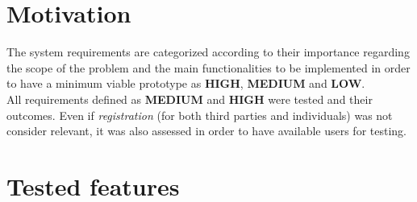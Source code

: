 \documentclass[a4paper, hidelinks, 12pt]{report}
\begin{document}
	\section{Motivation}
	The system requirements are categorized according to their importance regarding the scope of the problem and the main functionalities to be implemented in order to have a minimum viable prototype as \textbf{HIGH}, \textbf{MEDIUM} and \textbf{LOW}. \\

	All requirements defined as \textbf{MEDIUM} and \textbf{HIGH} were tested and their outcomes. Even if \textit{registration} (for both third parties and individuals) was not consider relevant, it was also assessed in order to have available users for testing.

	\section{Tested features}
\end{document}
